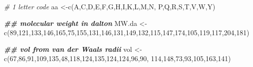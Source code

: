 \documentclass[
]{book}
\newenvironment{Shaded}{\begin{snugshade}}{\end{snugshade}}
\newcommand{\CommentTok}[1]{\textcolor[rgb]{0.56,0.35,0.01}{\textit{#1}}}
\newcommand{\DecValTok}[1]{\textcolor[rgb]{0.00,0.00,0.81}{#1}}
\newcommand{\DocumentationTok}[1]{\textcolor[rgb]{0.56,0.35,0.01}{\textbf{\textit{#1}}}}
\newcommand{\FunctionTok}[1]{\textcolor[rgb]{0.00,0.00,0.00}{#1}}
\newcommand{\NormalTok}[1]{#1}
\newcommand{\OtherTok}[1]{\textcolor[rgb]{0.56,0.35,0.01}{#1}}
\newcommand{\StringTok}[1]{\textcolor[rgb]{0.31,0.60,0.02}{#1}}
\begin{document}
\begin{Shaded}
\begin{Highlighting}[]
\CommentTok{\# 1 letter code}
\NormalTok{aa        }\OtherTok{\textless{}{-}}\FunctionTok{c}\NormalTok{(}\StringTok{\textquotesingle{}A\textquotesingle{}}\NormalTok{,}\StringTok{\textquotesingle{}C\textquotesingle{}}\NormalTok{,}\StringTok{\textquotesingle{}D\textquotesingle{}}\NormalTok{,}\StringTok{\textquotesingle{}E\textquotesingle{}}\NormalTok{,}\StringTok{\textquotesingle{}F\textquotesingle{}}\NormalTok{,}\StringTok{\textquotesingle{}G\textquotesingle{}}\NormalTok{,}\StringTok{\textquotesingle{}H\textquotesingle{}}\NormalTok{,}\StringTok{\textquotesingle{}I\textquotesingle{}}\NormalTok{,}\StringTok{\textquotesingle{}K\textquotesingle{}}\NormalTok{,}\StringTok{\textquotesingle{}L\textquotesingle{}}\NormalTok{,}\StringTok{\textquotesingle{}M\textquotesingle{}}\NormalTok{,}\StringTok{\textquotesingle{}N\textquotesingle{}}\NormalTok{,}
              \StringTok{\textquotesingle{}P\textquotesingle{}}\NormalTok{,}\StringTok{\textquotesingle{}Q\textquotesingle{}}\NormalTok{,}\StringTok{\textquotesingle{}R\textquotesingle{}}\NormalTok{,}\StringTok{\textquotesingle{}S\textquotesingle{}}\NormalTok{,}\StringTok{\textquotesingle{}T\textquotesingle{}}\NormalTok{,}\StringTok{\textquotesingle{}V\textquotesingle{}}\NormalTok{,}\StringTok{\textquotesingle{}W\textquotesingle{}}\NormalTok{,}\StringTok{\textquotesingle{}Y\textquotesingle{}}\NormalTok{)}


\DocumentationTok{\#\# molecular weight in dalton}
\NormalTok{MW.da     }\OtherTok{\textless{}{-}}\FunctionTok{c}\NormalTok{(}\DecValTok{89}\NormalTok{,}\DecValTok{121}\NormalTok{,}\DecValTok{133}\NormalTok{,}\DecValTok{146}\NormalTok{,}\DecValTok{165}\NormalTok{,}\DecValTok{75}\NormalTok{,}\DecValTok{155}\NormalTok{,}\DecValTok{131}\NormalTok{,}\DecValTok{146}\NormalTok{,}\DecValTok{131}\NormalTok{,}\DecValTok{149}\NormalTok{,}\DecValTok{132}\NormalTok{,}\DecValTok{115}\NormalTok{,}\DecValTok{147}\NormalTok{,}\DecValTok{174}\NormalTok{,}\DecValTok{105}\NormalTok{,}\DecValTok{119}\NormalTok{,}\DecValTok{117}\NormalTok{,}\DecValTok{204}\NormalTok{,}\DecValTok{181}\NormalTok{)}

\DocumentationTok{\#\# vol from van der Waals radii }
\NormalTok{vol    }\OtherTok{\textless{}{-}}\FunctionTok{c}\NormalTok{(}\DecValTok{67}\NormalTok{,}\DecValTok{86}\NormalTok{,}\DecValTok{91}\NormalTok{,}\DecValTok{109}\NormalTok{,}\DecValTok{135}\NormalTok{,}\DecValTok{48}\NormalTok{,}\DecValTok{118}\NormalTok{,}\DecValTok{124}\NormalTok{,}\DecValTok{135}\NormalTok{,}\DecValTok{124}\NormalTok{,}\DecValTok{124}\NormalTok{,}\DecValTok{96}\NormalTok{,}\DecValTok{90}\NormalTok{,}
              \DecValTok{114}\NormalTok{,}\DecValTok{148}\NormalTok{,}\DecValTok{73}\NormalTok{,}\DecValTok{93}\NormalTok{,}\DecValTok{105}\NormalTok{,}\DecValTok{163}\NormalTok{,}\DecValTok{141}\NormalTok{)}


\end{Highlighting}
\end{Shaded}
\end{document}
